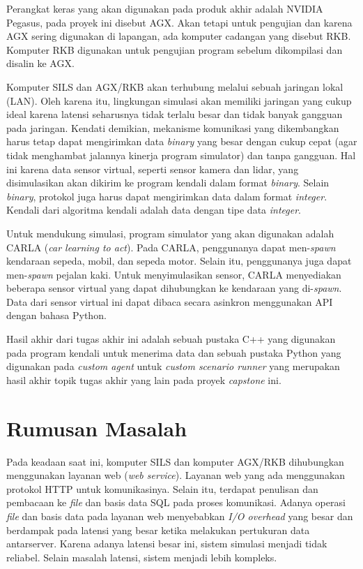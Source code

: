 Perangkat keras yang akan digunakan pada produk akhir adalah NVIDIA Pegasus,
pada proyek ini disebut AGX. Akan tetapi untuk pengujian dan karena AGX sering
digunakan di lapangan, ada komputer cadangan yang disebut RKB. Komputer RKB
digunakan untuk pengujian program sebelum dikompilasi dan disalin ke AGX.

Komputer SILS dan AGX/RKB akan terhubung melalui sebuah jaringan lokal (LAN).
Oleh karena itu, lingkungan simulasi akan memiliki jaringan yang cukup ideal
karena latensi seharusnya tidak terlalu besar dan tidak banyak gangguan pada
jaringan. Kendati demikian, mekanisme komunikasi yang dikembangkan harus tetap
dapat mengirimkan data \textit{binary} yang besar dengan cukup cepat (agar tidak
menghambat jalannya kinerja program simulator) dan tanpa gangguan. Hal ini
karena data sensor virtual, seperti sensor kamera dan lidar, yang disimulasikan
akan dikirim ke program kendali dalam format \textit{binary}. Selain
\textit{binary}, protokol juga harus dapat mengirimkan data dalam format
\textit{integer}. Kendali dari algoritma kendali adalah data dengan tipe data
\textit{integer}.

Untuk mendukung simulasi, program simulator yang akan digunakan adalah CARLA
(\textit{car learning to act}). Pada CARLA, penggunanya dapat men-\textit{spawn}
kendaraan sepeda, mobil, dan sepeda motor. Selain itu, penggunanya juga dapat
men-\textit{spawn} pejalan kaki. Untuk menyimulasikan sensor, CARLA menyediakan
beberapa sensor virtual yang dapat dihubungkan ke kendaraan yang
di-\textit{spawn}. Data dari sensor virtual ini dapat dibaca secara asinkron
menggunakan API dengan bahasa Python.

Hasil akhir dari tugas akhir ini adalah sebuah pustaka C++ yang digunakan pada
program kendali untuk menerima data dan sebuah pustaka Python yang digunakan
pada \textit{custom agent} untuk \textit{custom scenario runner} yang merupakan
hasil akhir topik tugas akhir yang lain pada proyek \textit{capstone} ini.

\section{Rumusan Masalah}

Pada keadaan saat ini, komputer SILS dan komputer AGX/RKB dihubungkan
menggunakan layanan web (\textit{web service}). Layanan web yang ada menggunakan
protokol HTTP untuk komunikasinya. Selain itu, terdapat penulisan dan pembacaan
ke \textit{file} dan basis data SQL pada proses komunikasi. Adanya operasi
\textit{file} dan basis data pada layanan web menyebabkan \textit{I/O overhead}
yang besar dan berdampak pada latensi yang besar ketika melakukan pertukuran
data antarserver. Karena adanya latensi besar ini, sistem simulasi menjadi tidak
reliabel. Selain masalah latensi, sistem menjadi lebih kompleks.

